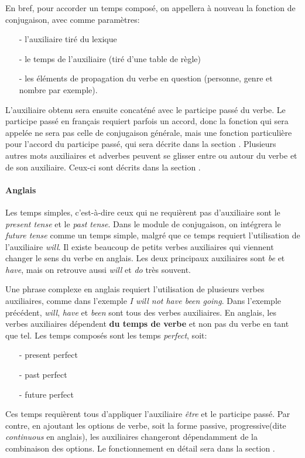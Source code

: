 \documentclass[11pt]{article} %
\newcommand{\real}[1]{\emph{#1}}
\begin{document}
En bref, pour accorder un temps
composé, on appellera à nouveau la fonction de conjugaison, avec comme
paramètres:
\begin{itemize}
\item[-] l'auxiliaire tiré du lexique
\item[-] le temps de l'auxiliaire (tiré d'une table de règle)
\item[-] les éléments de propagation du verbe en question (personne, genre et nombre par exemple).
\end{itemize}
L'auxiliaire obtenu
sera ensuite concaténé avec le participe passé du verbe. Le participe passé 
en français requiert
parfois un accord, donc la fonction qui sera appelée ne sera pas celle
de conjugaison générale, mais une fonction particulière pour l'accord du
participe passé, qui sera décrite dans la section \hyperref[accordpp]{}. Plusieurs
autres mots auxiliaires et adverbes peuvent se glisser entre ou autour
du verbe et de son auxiliaire. Ceux-ci sont décrits dans la section
\hyperref[vOptions]{}.

\paragraph{Anglais}

Les temps simples, c'est-à-dire ceux qui ne requièrent pas d'auxiliaire
sont le \emph{present tense} et le \emph{past tense}. Dans le module de
conjugaison, on intégrera le \emph{future tense} comme un temps simple, malgré
que ce temps requiert l'utilisation de l'auxiliaire \emph{will}.
Il existe beaucoup de petits verbes auxiliaires qui viennent changer
le sens du verbe en anglais. Les deux principaux auxiliaires sont \emph{be}
et \emph{have}, mais on retrouve aussi \emph{will} et \emph{do} très souvent.

Une phrase complexe en anglais requiert l'utilisation de plusieurs verbes auxiliaires,
comme dans l'exemple \real{I will not have been going}. Dans l'exemple
précédent, \emph{will}, \emph{have} et \emph{been} sont tous des verbes
auxiliaires. En anglais,
les verbes auxiliaires dépendent \textbf{du temps de verbe} et non pas du 
verbe en tant que tel. Les temps composés sont les
temps \emph{perfect}, soit:
\begin{itemize}
\item[-]present perfect
\item[-]past perfect
\item[-]future perfect
\end{itemize} Ces temps requièrent tous d'appliquer l'auxiliaire
\emph{être} et le participe passé. Par contre, en ajoutant les options
de verbe, soit la forme passive, progressive(dite \emph{continuous}
en anglais), les auxiliaires changeront dépendamment de la combinaison
des options. Le fonctionnement en détail sera dans la section \hyperref[vOptions]{}.
\end{document}
